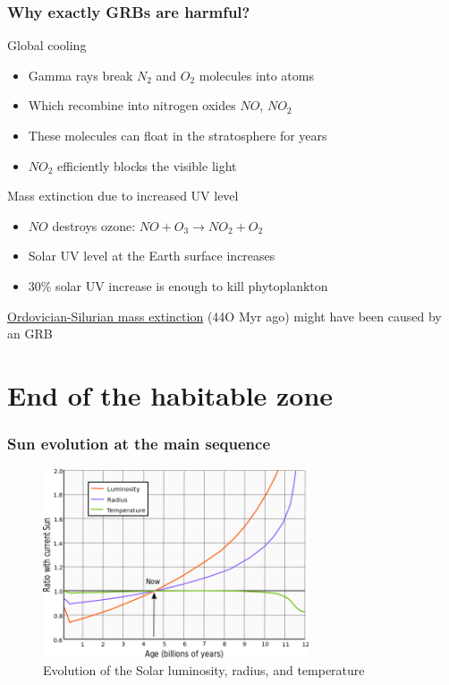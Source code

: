 \documentclass{beamer}
\begin{document}
\begin{frame}
\frametitle{Why exactly GRBs are harmful?}
\begin{block}{Global cooling}
\begin{itemize}
\item Gamma rays break $N_2$ and $O_2$ molecules into atoms
\item Which recombine into nitrogen oxides $NO$, $NO_2$
\item These molecules can float in the stratosphere for years
\item $NO_2$ efficiently blocks the visible light
\end{itemize}
\end{block}

\begin{block}{Mass extinction due to increased UV level}
\begin{itemize}
\item $NO$ destroys ozone: $NO + O_3 \to NO_2 + O_2$
\item Solar UV level at the Earth surface increases
\item 30\% solar UV increase is enough to kill phytoplankton 
\end{itemize}
\href{http://en.wikipedia.org/wiki/Ordovician\%E2\%80\%93Silurian_extinction_events}{Ordovician-Silurian mass extinction}
(44O Myr ago) might have been caused by an GRB \cite{arXiv:astro-ph/0309415}
\end{block}
\end{frame}


\section{End of the habitable zone}
\begin{frame}
\frametitle{Sun evolution at the main sequence}
\begin{figure}
\includegraphics[width=0.7\textwidth]{img/640px-Solar_evolution_(English).png}
\captionsetup{labelformat=empty}
\caption{Evolution of the Solar luminosity, radius, and temperature \cite{arXiv:0911.4872}}
\end{figure}
\end{frame}
\end{document}
